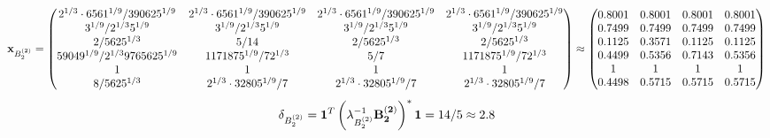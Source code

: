 \documentclass[10pt,a4paper]{article}
\begin{document}
	\[
		\bold{x}_{B_2^{(2)}} = 
		\begin{pmatrix}
			{{2^ {1 / 3}} \cdot {6561^ {1 / 9}}} / {{390625^ {1 / 9}}} & {{2^ {1 / 3}} \cdot {6561^ {1 / 9}}} / {{390625^ {1 / 9}}} & {{2^ {1 / 3}} \cdot {6561^ {1 / 9}}} / {{390625^ {1 / 9}}} & {{2^ {1 / 3}} \cdot {6561^ {1 / 9}}} / {{390625^ {1 / 9}}} \\
			{{3^ {1 / 9}}} / {{2^ {1 / 3}}{5^ {1 / 9}}} & {{3^ {1 / 9}}} / {{2^ {1 / 3}}{5^ {1 / 9}}} & {{3^ {1 / 9}}} / {{2^ {1 / 3}}{5^ {1 / 9}}} & {{3^ {1 / 9}}} / {{2^ {1 / 3}}{5^ {1 / 9}}} \\
			{{2}} / {{5625^ {1 / 3}}} & {{5}} / {{14}} & {{2}} / {{5625^ {1 / 3}}} & {{2}} / {{5625^ {1 / 3}}} \\
			{{59049^ {1 / 9}}} / {{2^ {1 / 3}}{9765625^ {1 / 9}}} & {{1171875^ {1 / 9}}} / {{7}{2^ {1 / 3}}} & {{5}} / {{7}} & {{1171875^ {1 / 9}}} / {{7}{2^ {1 / 3}}} \\
			{1}{} & {1}{} & {1}{} & {1}{} \\
			{{8}} / {{5625^ {1 / 3}}} & {{2^ {1 / 3}} \cdot {32805^ {1 / 9}}} / {{7}} & {{2^ {1 / 3}} \cdot {32805^ {1 / 9}}} / {{7}} & {{2^ {1 / 3}} \cdot {32805^ {1 / 9}}} / {{7}} \\
		\end{pmatrix}
		\approx
		\begin{pmatrix}
			0.8001   & 0.8001   & 0.8001   & 0.8001   \\
			0.7499   & 0.7499   & 0.7499   & 0.7499   \\
			0.1125   & 0.3571   & 0.1125   & 0.1125   \\
			0.4499   & 0.5356   & 0.7143   & 0.5356   \\
			1        & 1        & 1        & 1        \\
			0.4498   & 0.5715   & 0.5715   & 0.5715   \\
		\end{pmatrix}
	\]
	\[
		\delta_{B_2^{(2)}} = \bold{1}^T \left(\lambda_{B_2^{(2)}}^{-1}\bold{B_2^{(2)}}\right)^* \bold{1} = {{14}} / {{5}}\approx 2.8
	\]
\end{document}
